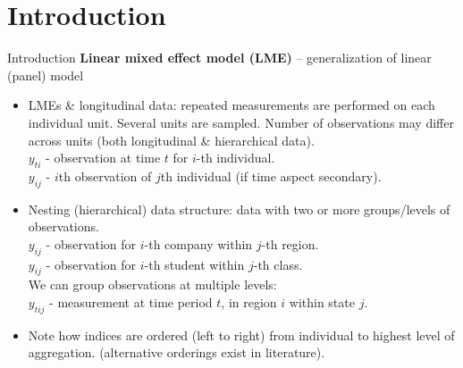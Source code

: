 \documentclass{beamer}
\begin{document}
\section{Introduction}
\begin{frame}{Introduction}
\small 
\textbf{Linear mixed effect model (LME)} -- generalization of linear (panel) model
\medskip
\begin{itemize}
\item LMEs \& longitudinal data: repeated measurements are performed on each individual  unit. Several units are sampled. Number of observations may differ across units (both longitudinal \& hierarchical data).\\ \smallskip
\quad $y_{ti}$ - observation at time $t$ for $i$-th individual. \\  
\quad $y_{ij}$ - $i$th observation of $j$th individual (if time aspect secondary). \\ 
\bigskip
\item Nesting (hierarchical) data structure: data with two or more groups/levels of observations. \\ \smallskip
\quad $y_{ij}$ - observation for $i$-th company within $j$-th region. \\ 
\quad $y_{ij}$ - observation for $i$-th student within $j$-th class. \\ 
\medskip
We can group observations at multiple levels:\\
\smallskip
\quad $y_{tij}$ - measurement at time period $t$,  in region $i$ within state $j$.\\ 
\bigskip
\item Note how indices are ordered (left to right) from individual to highest level of aggregation. (alternative orderings exist in literature).
\end{itemize}
\end{frame}
\end{document}
